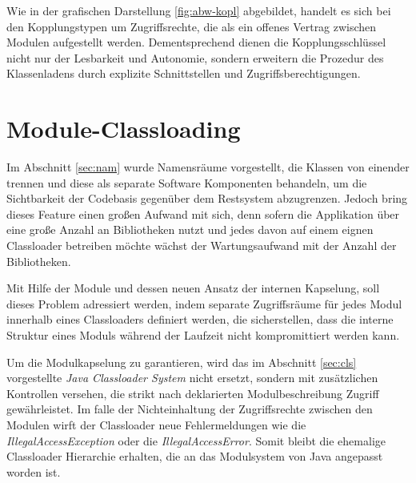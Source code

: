   Wie in der grafischen Darstellung \ref{fig:abw-kopl} abgebildet, handelt es sich bei den Kopplungstypen um Zugriffsrechte, die als ein offenes Vertrag zwischen Modulen aufgestellt werden. Dementsprechend dienen die Kopplungsschlüssel nicht nur der Lesbarkeit und Autonomie, sondern erweitern die Prozedur des Klassenladens durch explizite Schnittstellen und Zugriffsberechtigungen.

  \section{Module-Classloading} \label{sec:mod-cll}
  Im Abschnitt \ref{sec:nam} wurde Namensräume vorgestellt, die Klassen von einender trennen und diese als separate Software Komponenten behandeln, um die Sichtbarkeit der Codebasis gegenüber dem Restsystem abzugrenzen. Jedoch bring dieses Feature einen großen Aufwand mit sich, denn sofern die Applikation über eine große Anzahl an Bibliotheken nutzt und jedes davon auf einem eignen Classloader betreiben möchte wächst der Wartungsaufwand mit der Anzahl der Bibliotheken.


  Mit Hilfe der Module und dessen neuen Ansatz der internen Kapselung, soll dieses Problem adressiert werden, indem separate Zugriffsräume für jedes Modul innerhalb eines Classloaders definiert werden, die sicherstellen, dass die interne Struktur eines Moduls während der Laufzeit nicht kompromittiert werden kann.


  Um die Modulkapselung zu garantieren, wird das im Abschnitt \ref{sec:cls} vorgestellte \textit{Java Classloader System} nicht ersetzt, sondern mit zusätzlichen Kontrollen versehen, die strikt nach deklarierten Modulbeschreibung Zugriff gewährleistet. Im falle der Nichteinhaltung der Zugriffsrechte zwischen den Modulen wirft der Classloader neue Fehlermeldungen wie die \textit{IllegalAccessException} oder die \textit{IllegalAccessError}. Somit bleibt die ehemalige Classloader Hierarchie erhalten, die an das Modulsystem von Java angepasst worden ist.\bigbreak

